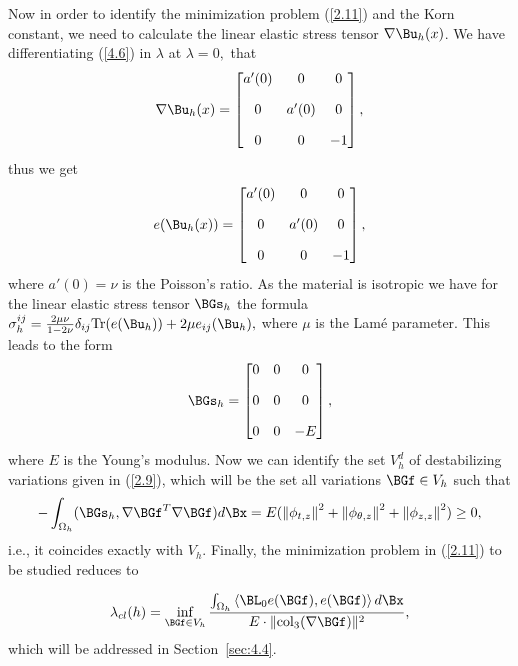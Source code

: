 Now in order to identify the minimization problem (\ref{2.11}) and the Korn constant, we need to calculate the linear elastic stress tensor $\nabla \Bu_h(x)$. We have differentiating (\ref{4.6}) in $\lambda$ at $\lambda=0,$ that 
$$
\nabla \Bu_h(x)=
\begin{bmatrix} 
a'(0) & 0 & 0\\[10pt]
0 & a'(0) & 0\\[10pt] 
0&0&-1
\end{bmatrix},
$$
thus we get 
$$e(\Bu_h(x))=
\begin{bmatrix} 
a'(0) &  0 & 0\\[10pt]
 0 & a'(0)& 0\\[10pt] 
 0 &0 &-1
 \end{bmatrix},
 $$
 where $a'(0)=\nu$ is the Poisson's ratio. As the material is isotropic we have for the 
 linear elastic stress tensor $\BGs_h$ the formula $\Gs_h^{ij}=\frac{2\mu\nu}{1-2\nu}\delta_{ij} \mathrm{Tr}(e(\Bu_h))+2\mu e_{ij}(\Bu_h),$ where $\mu$ is the Lam\'e parameter. This leads to the form 
\begin{equation}
\label{4.9} 
\BGs_h=
 \begin{bmatrix} 
0 & 0& 0\\[10pt]
 0 & 0 & 0\\[10pt]
 0 & 0 & -E
 \end{bmatrix},
 \end{equation}
where $E$ is the Young's modulus. Now we can identify the set $V_h^d$ of destabilizing variations given in (\ref{2.9}), which will be the set all variations $\BGf\in V_h$ such that 
$$-\int_{\Omega_h}(\BGs_h,\nabla\BGf^T\nabla\BGf)d\Bx=E(\left\|\phi_{t,z}\right\|^{2}+\left\|\phi_{\theta,z}\right\|^{2}+\left\|\phi_{z,z}\right\|^{2})\geq 0,$$
i.e., it coincides exactly with $V_h.$ Finally, the minimization problem in (\ref{2.11}) to be studied reduces to 

\begin{equation}
\label{4.10}
\Gl_{cl}(h)=\inf_{\BGf\in V_h} \frac{\int_{\Omega_h} \left\langle \BL_{0} e(\BGf), e(\BGf)\right\rangle d\Bx}
{E\cdot \|\mathrm{col}_3(\nabla\BGf)\|^{2}},
\end{equation}
which will be addressed in Section~\ref{sec:4.4}.














